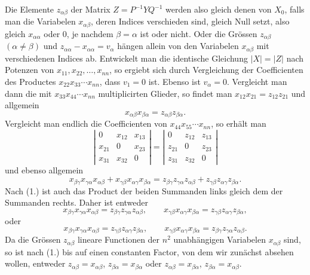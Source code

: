 \documentclass[11pt]{article}
\begin{document}
Die Elemente $z_{\alpha\beta}$ der Matrix $Z=P^{-1}YQ^{-1}$ werden also gleich denen von $X_0$, falls man die Variabelen $x_{\alpha\beta}$, deren Indices verschieden sind, gleich Null setzt, also gleich $x_{\alpha\alpha}$ oder 0, je nachdem $\beta=\alpha$ ist oder nicht. Oder die Grössen $z_{\alpha\beta}$ $(\alpha\ne\beta)$ und $z_{\alpha\alpha}-x_{\alpha\alpha}=v_\alpha$ hängen allein von den Variabelen $x_{\alpha\beta}$ mit verschiedenen Indices ab. Entwickelt man die identische Gleichung $|X|=|Z|$ nach Potenzen von $x_{11},x_{22},\ldots,x_{nn}$, so ergiebt sich durch Vergleichung der Coefficienten des Productes $x_{22}x_{33}\cdots x_{nn}$, dass $v_1=0$ ist. Ebenso ist $v_\alpha=0$. Vergleicht man dann die mit $x_{33}x_{44}\cdots x_{nn}$ multiplicirten Glieder, so findet man $x_{12}x_{21}=z_{12}z_{21}$ und allgemein
\begin{equation}\tag{1.}
x_{\alpha\beta}x_{\beta\alpha}=z_{\alpha\beta}z_{\beta\alpha}.
\end{equation}
Vergleicht man endlich die Coefficienten von $x_{44}x_{55}\cdots x_{nn}$, so erhält man
\[
\left|\begin{array}{ccc}
0&x_{12}&x_{13}\\
x_{21}&0&x_{23}\\
x_{31}&x_{32}&0
\end{array}\right|=
\left|\begin{array}{ccc}
0&z_{12}&z_{13}\\
z_{21}&0&z_{23}\\
z_{31}&z_{32}&0
\end{array}\right|
\]
und ebenso allgemein
\[
x_{\beta\gamma}x_{\gamma\alpha}x_{\alpha\beta}+x_{\gamma\beta}x_{\alpha\gamma}x_{\beta\alpha}
=z_{\beta\gamma}z_{\gamma\alpha}z_{\alpha\beta}+z_{\gamma\beta}z_{\alpha\gamma}z_{\beta\alpha}.
\]
Nach (1.) ist auch das Product der beiden Summanden links gleich dem der Summanden rechts. Daher ist entweder
\[
x_{\beta\gamma}x_{\gamma\alpha}x_{\alpha\beta}=z_{\beta\gamma}z_{\gamma\alpha}z_{\alpha\beta},
\qquad
x_{\gamma\beta}x_{\alpha\gamma}x_{\beta\alpha}=z_{\gamma\beta}z_{\alpha\gamma}z_{\beta\alpha},
\]
oder
\[
x_{\beta\gamma}x_{\gamma\alpha}x_{\alpha\beta}=z_{\gamma\beta}z_{\alpha\gamma}z_{\beta\alpha},
\qquad
x_{\gamma\beta}x_{\alpha\gamma}x_{\beta\alpha}=z_{\beta\gamma}z_{\gamma\alpha}z_{\alpha\beta}.
\]
Da die Grössen $z_{\alpha\beta}$ lineare Functionen der $n^2$ unabhängigen Variabelen $x_{\alpha\beta}$ sind, so ist nach (1.) bis auf einen constanten Factor, von dem wir zunächst absehen wollen, entweder $z_{\alpha\beta}=x_{\alpha\beta}$, $z_{\beta\alpha}=x_{\beta\alpha}$ oder $z_{\alpha\beta}=x_{\beta\alpha}$, $z_{\beta\alpha}=x_{\alpha\beta}$.
\end{document}
